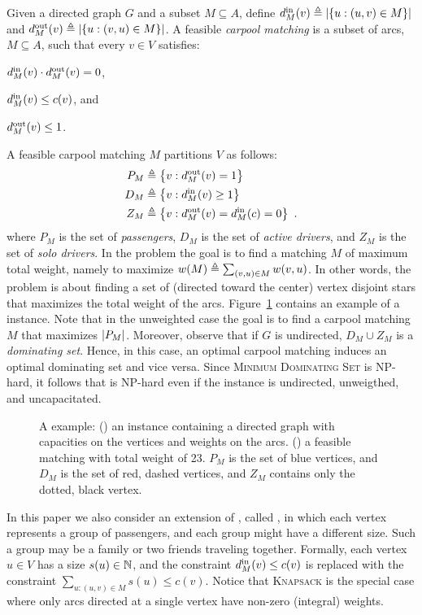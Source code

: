 Given a directed graph $G$ and a subset $M \subseteq A$, define
$\din[M](v) \eqdf \abs{\set{u :(u,v) \in M}}$ and
$\dout[M](v) \eqdf \abs{\set{u :(v,u) \in M}}$.
%
A feasible \emph{carpool matching} is a subset of arcs, $M \subseteq
A$, such that every $v \in V$ satisfies:%
\begin{inparaenum}[(i)]
\item $\din[M](v) \cdot \dout[M](v) = 0$,
\item $\din[M](v) \leq c(v)$, and 
\item $\dout[M](v) \leq 1$.
\end{inparaenum}
A feasible carpool matching $M$ partitions $V$ as follows:
\begin{align*}
P_M & \eqdf \set{v : \dout[M](v) = 1} \\
D_M & \eqdf \set{v : \din[M](v) \geq 1} \\
Z_M & \eqdf \set{v : \dout[M](v) = \din[M](c) = 0}
~.
\end{align*}
where $P_M$ is the set of \emph{passengers}, $D_M$ is the set of
\emph{active drivers}, and $Z_M$ is the set of \emph{solo drivers}.
%
In the \carpool problem the goal is to find a matching $M$ of maximum
total weight, namely to maximize $w(M) \eqdf \sum_{(v,u) \in M}
w(v,u)$.  In other words, the \carpool problem is about finding a set
of (directed toward the center) vertex disjoint stars that maximizes
the total weight of the arcs.  
%
Figure~\ref{fig:carpool} contains an example of a \carpool instance.
%
Note that in the unweighted case the goal is to find a carpool
matching $M$ that maximizes $\abs{P_M}$.
%
Moreover, observe that if $G$ is undirected, $D_M \cup Z_M$ is
a \emph{dominating set}.  Hence, in this case, an optimal carpool
matching induces an optimal dominating set and vice versa.
Since \textsc{Minimum Dominating Set} is NP-hard, it follows
that \carpool is NP-hard even if the instance is undirected,
unweigthed, and uncapacitated.

\begin{figure}
\centering

\caption[]{
\label{fig:carpool}
A \carpool example: () an instance containing a
directed graph with capacities on the vertices and weights on the
arcs.  () a feasible matching with total weight
of 23.  $P_M$ is the set of blue vertices, and $D_M$ is the set of
red, dashed vertices, and $Z_M$ contains only the dotted, black
vertex.  }
\end{figure}  

In this paper we also consider an extension of \carpool, called \gcp,
in which each vertex represents a group of passengers, and each group
might have a different size.  Such a group may be a family or two
friends traveling together.  Formally, each vertex $u \in V$ has a
size $s(u) \in \N$, and the constraint $\din[M](v) \leq c(v)$ is
replaced with the constraint $\sum_{u:(u,v) \in M} s(u) \leq c(v)$.
%
Notice that \textsc{Knapsack} is the special case where only arcs
directed at a single vertex have non-zero (integral) weights.

